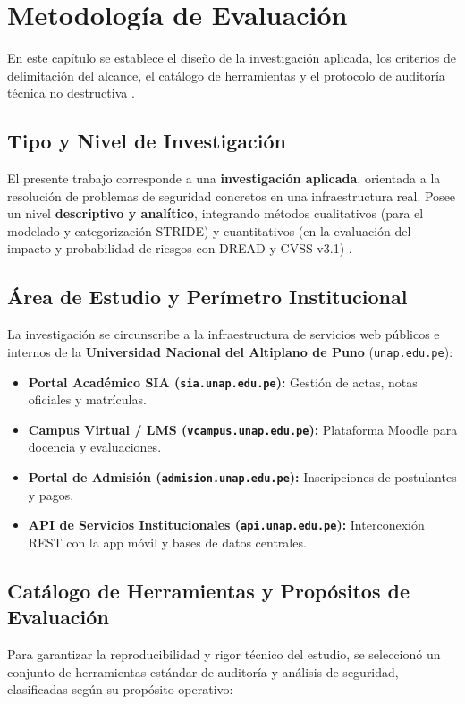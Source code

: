\chapter{Metodología de Evaluación}
\label{ch:metodologia}

En este capítulo se establece el diseño de la investigación aplicada, los criterios de delimitación del alcance, el catálogo de herramientas y el protocolo de auditoría técnica no destructiva \citep{nist2008sp800115}.

\section{Tipo y Nivel de Investigación}
El presente trabajo corresponde a una \textbf{investigación aplicada}, orientada a la resolución de problemas de seguridad concretos en una infraestructura real. Posee un nivel \textbf{descriptivo y analítico}, integrando métodos cualitativos (para el modelado y categorización STRIDE) y cuantitativos (en la evaluación del impacto y probabilidad de riesgos con DREAD y CVSS v3.1) \citep{first2019cvss,meier2003improving}.

\section{Área de Estudio y Perímetro Institucional}
La investigación se circunscribe a la infraestructura de servicios web públicos e internos de la \textbf{Universidad Nacional del Altiplano de Puno} (\texttt{unap.edu.pe}):

\begin{itemize}
    \item \textbf{Portal Académico SIA (\texttt{sia.unap.edu.pe}):} Gestión de actas, notas oficiales y matrículas.
    \item \textbf{Campus Virtual / LMS (\texttt{vcampus.unap.edu.pe}):} Plataforma Moodle para docencia y evaluaciones.
    \item \textbf{Portal de Admisión (\texttt{admision.unap.edu.pe}):} Inscripciones de postulantes y pagos.
    \item \textbf{API de Servicios Institucionales (\texttt{api.unap.edu.pe}):} Interconexión REST con la app móvil y bases de datos centrales.
\end{itemize}

\section{Catálogo de Herramientas y Propósitos de Evaluación}
Para garantizar la reproducibilidad y rigor técnico del estudio, se seleccionó un conjunto de herramientas estándar de auditoría y análisis de seguridad, clasificadas según su propósito operativo:

